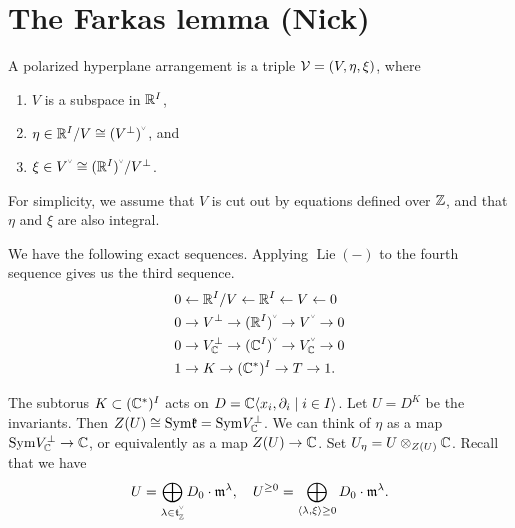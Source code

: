 \newpage

\newcommand{\dual}{\raisebox{0.5ex}{\scalebox{0.5}[0.4]{$\vee$}}}

\section{The Farkas lemma (Nick)}

\begin{definition}
  A polarized hyperplane arrangement is a triple $\mathcal{V} = (V,\eta,\xi)$, where
  \begin{enumerate}
  \item $V$ is a subspace in $\mathbb{R}^I$,
  \item $\eta \in \bbR^I/V \cong (V^\perp)^{\dual}$, and
  \item $\xi\in V^{\dual} \cong (\bbR^I)^{\dual}/ V^\perp$.
  \end{enumerate}
\end{definition}
For simplicity, we assume that $V$ is cut out by equations defined over $\mathbb{Z}$, and that $\eta$ and $\xi$ are also integral.

We have the following exact sequences.
Applying $\operatorname{Lie}(-)$ to the fourth sequence gives us the third sequence.
\begin{align*}
  0 &\from \bbR^I/V \from \bbR^I \from V \from 0\\
  0 &\to V^\perp \to (\bbR^I)^{\dual} \to V^{\dual}\to 0\\
  0 &\to V^\perp_\bbC \to (\bbC^I)^{\dual} \to V^{\dual}_{\bbC}\to 0\\
  1 &\to K \to (\bbC^*)^I \to T \to 1.
\end{align*}

The subtorus $K\subset (\mathbb{C}^*)^I$ acts on $D = \mathbb{C}\langle x_i,\partial_i \mid i\in I \rangle$.
Let $U = D^K$ be the invariants.
Then $Z(U) \cong {\rm Sym } \mathfrak{k} = {\rm Sym } V^\perp_{\mathbb{C}}$.
We can think of $\eta$ as a map ${\rm Sym } V^\perp_{\mathbb{C}}\to \mathbb{C}$, or equivalently as a map $Z(U)\to \mathbb{C}$.
Set $U_\eta = U\otimes_{Z(U)}\mathbb{C}$.
Recall that we have
\[
  U = \bigoplus_{\lambda\in \frakt^{\dual}_\bbZ}D_0\cdot\frakm^\lambda,\quad U^{\geq 0} = \bigoplus_{\langle \lambda, \xi \rangle \geq 0}D_0\cdot \frakm^{\lambda}.
\]




 	





